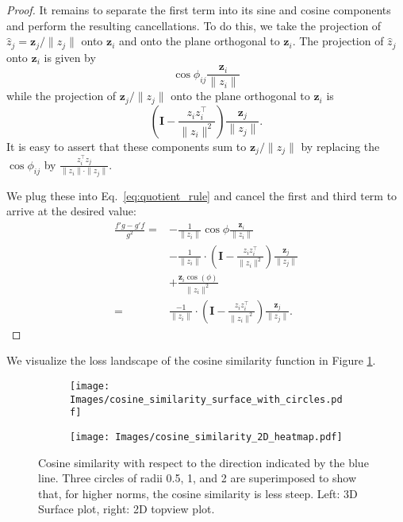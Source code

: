 \begin{proof}
    It remains to separate the first term into its sine and cosine components and perform the resulting cancellations. To do this, we take the projection of $\hat{z}_j = \mathbf{z}_j / \|z_j\|$ onto $\mathbf{z}_i$ and onto the plane orthogonal to $\mathbf{z}_i$. The projection of $\hat{z}_j$ onto $\mathbf{z}_i$ is given by
    \[ \cos \phi_{ij} \frac{\mathbf{z}_i}{\|z_i\|} \]
    while the projection of $\mathbf{z}_j / \|z_j\|$ onto the plane orthogonal to $\mathbf{z}_i$ is
    \[ \left( \mathbf{I} - \frac{z_i z_i^\top}{\|z_i\|^2} \right) \frac{\mathbf{z}_j}{\|z_j\|}. \]
    It is easy to assert that these components sum to $\mathbf{z}_j/\|z_j\|$ by replacing the $\cos \phi_{ij}$ by $\frac{z_i^\top z_j}{\|z_i\|\cdot \|z_j\|}$.

    We plug these into Eq.~\ref{eq:quotient_rule} and cancel the first and third term to arrive at the desired value:
    \begin{align*}
        \frac{f' g - g' f}{g^2} = &-\frac{1}{\|z_i\|} \cos \phi \frac{\mathbf{z}_i}{\|z_i\|} \\
        &- \frac{1}{\|z_i\|} \cdot \left( \mathbf{I} - \frac{z_i z_i^\top}{\|z_i\|^2} \right) \frac{\mathbf{z}_j}{\|z_j\|} \\
        &+ \frac{\mathbf{z}_i \cos(\phi)}{\|z_i\|^2} \\
        = &\frac{-1}{\|z_i\|} \cdot \left( \mathbf{I} - \frac{z_i z_i^\top}{\|z_i\|^2} \right) \frac{\mathbf{z}_j}{\|z_j\|}.
    \end{align*}
\end{proof}

We visualize the loss landscape of the cosine similarity function in Figure \ref{fig:cos_sim_surface}. 

\begin{figure}
    \centering
    \begin{subfigure}{0.45\linewidth}
        \centering 
        \texttt{[image: Images/cosine\_similarity\_surface\_with\_circles.pdf]}
    \end{subfigure}%
    \begin{subfigure}{0.45\linewidth}
        \centering 
        \texttt{[image: Images/cosine\_similarity\_2D\_heatmap.pdf]}
    \end{subfigure}
    \caption{Cosine similarity with respect to the direction indicated by the blue line. Three circles of radii 0.5, 1, and 2 are superimposed to show that, for higher norms, the cosine similarity is less steep. Left: 3D Surface plot, right: 2D topview plot.}
    \label{fig:cos_sim_surface}
\end{figure}


